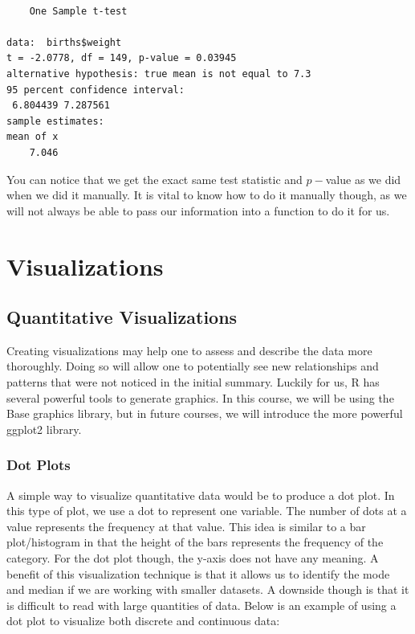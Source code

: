\documentclass[
  letterpaper,
  DIV=11,
  numbers=noendperiod]{scrreprt}
\begin{document}
\begin{verbatim}

    One Sample t-test

data:  births$weight
t = -2.0778, df = 149, p-value = 0.03945
alternative hypothesis: true mean is not equal to 7.3
95 percent confidence interval:
 6.804439 7.287561
sample estimates:
mean of x 
    7.046 
\end{verbatim}

You can notice that we get the exact same test statistic and \(p-\)value
as we did when we did it manually. It is vital to know how to do it
manually though, as we will not always be able to pass our information
into a function to do it for us.


\chapter{Visualizations}\label{visualizations}

\section{Quantitative Visualizations}\label{quantitative-visualizations}

Creating visualizations may help one to assess and describe the data
more thoroughly. Doing so will allow one to potentially see new
relationships and patterns that were not noticed in the initial summary.
Luckily for us, R has several powerful tools to generate graphics. In
this course, we will be using the Base graphics library, but in future
courses, we will introduce the more powerful ggplot2 library.

\subsection{Dot Plots}\label{dot-plots}

A simple way to visualize quantitative data would be to produce a dot
plot. In this type of plot, we use a dot to represent one variable. The
number of dots at a value represents the frequency at that value. This
idea is similar to a bar plot/histogram in that the height of the bars
represents the frequency of the category. For the dot plot though, the
y-axis does not have any meaning. A benefit of this visualization
technique is that it allows us to identify the mode and median if we are
working with smaller datasets. A downside though is that it is difficult
to read with large quantities of data. Below is an example of using a
dot plot to visualize both discrete and continuous data:
\end{document}
